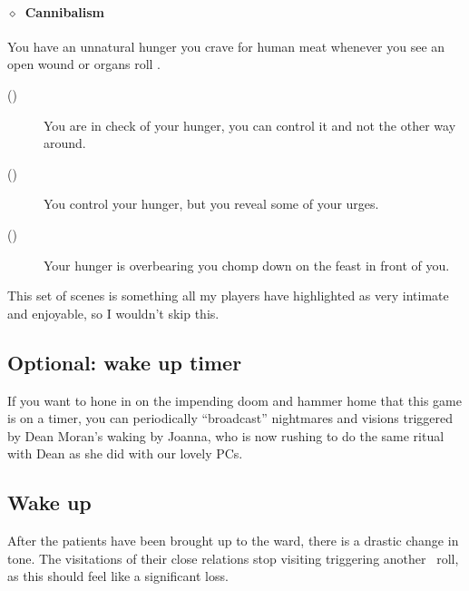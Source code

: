 \documentclass[bg-full]{resources/stylesheets/kult}
\begin{document}

\paragraph{\(\diamond\)~Cannibalism}\label{disadv:cannibalism}%
You have an unnatural hunger you crave for human meat whenever you see an open wound or organs roll .
\begin{description}
  \item[()] You are in check of your hunger, you can control it and not the other way around.
  \item[()] You control your hunger, but you reveal some of your urges.
  \item[()] Your hunger is overbearing you chomp down on the feast in front of you.
\end{description}
\KULTrule%

This set of scenes is something all my players have highlighted as very intimate and enjoyable, so I wouldn't skip this.

\subsection*{Optional: wake up timer}
If you want to hone in on the impending doom and hammer home that this game is on a timer, you can periodically “broadcast”
nightmares and visions triggered by Dean Moran's waking by Joanna, who is now rushing to do the same ritual
with Dean as she did with our lovely PCs.

\subsection{Wake up}%
\label{sub:wake_up}

After the patients have been brought up to the ward, there is a drastic change in tone.  The visitations of their close relations
stop visiting triggering another~ roll, as this should feel like a significant loss.
\end{document}
